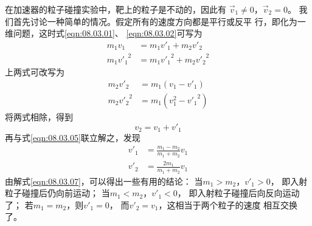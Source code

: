 在加速器的粒子碰撞实验中，靶上的粒子是不动的，因此有
$ \vec { v } _ { 1 } \ne 0 $，$ \vec { v } _ { 2 } = 0 $。
我们首先讨论一种简单的情况。假定所有的速度方向都是平行或反平
行，即化为一维问题，这时式\eqref{eqn:08.03.01}、
\eqref{eqn:08.03.02}可写为
\begin{align}
  m _ { 1 } v _ { 1 }               & = m _ { 1 } v ' _ { 1 } + m _ { 2 } v ' _ { 2 } \label{eqn:08.03.03}                          \\
  m _ { 1 } { v ' _ { 1 } } ^ { 2 } & = m _ { 1 } { v ' _ { 1 } } ^ { 2 } + m _ { 2 } { v ' _ { 2 } } ^ { 2 }  \label{eqn:08.03.04}
\end{align}
上两式可改写为
\begin{align}
  m _ { 2 } v ' _ { 2 }             & = m _ { 1 } \left( v _ { 1 } - v ' _ { 1 } \right) \label{eqn:08.03.05}                     \\
  m _ { 2 } { v ' _ { 2 } } ^ { 2 } & = m _ { 1 } \left( v _ { 1 } ^ { 2 } - { v ' _ { 1 } } ^ { 2 } \right) \label{eqn:08.03.06}
\end{align}
将两式相除，得到
\begin{equation*}
  v _ { 2 } = v _ { 1 } + v ' _ { 1 }
\end{equation*}
再与式\eqref{eqn:08.03.05}联立解之，发现
\begin{equation}\label{eqn:08.03.07}
  \begin{split}
    v ' _ { 1 } & = \frac { m _ { 1 } - m _ { 2 } } { m _ { 1 } + m _ { 2 } } v _ { 1 } \\
    v ' _ { 2 } & = \frac { 2 m _ { 1 } } { m _ { 1 } + m _ { 2 } } v _ { 1 }
  \end{split}
\end{equation}
由解式\eqref{eqn:08.03.07}，可以得出一些有用的结论：
当$ m _ { 1 } > m _ { 2 } $，$ v ' _ { 1 } > 0 $，
即入射粒子碰撞后仍向前运动；
当$ m _ { 1 } < m _ { 2 } $，$ v ' _ { 1 } < 0 $，
即入射粒子碰撞后向反向运动了；
若$ m _ { 1 } = m _ { 2 } $，则$ v ' _ { 1 } = 0 $，
而$ v ' _ { 2 } = v _ { 1 } $，这相当于两个粒子的速度
相互交换了。

